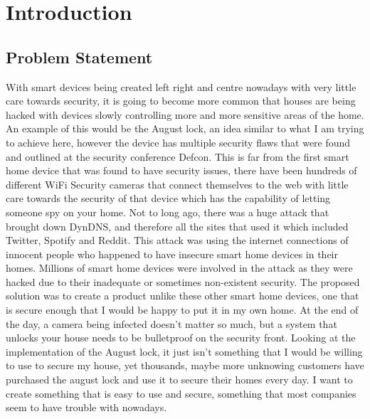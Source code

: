\chapter{Introduction}
\label{chap:intro}

\section{Problem Statement}
With smart devices being created left right and centre nowadays with very little care towards security, it is going to become more common that houses are being hacked with devices slowly controlling more and more sensitive areas of the home. An example of this would be the August lock, an idea similar to what I am trying to achieve here, however the device has multiple security flaws that were found and outlined at the security conference Defcon. This is far from the first smart home device that was found to have security issues, there have been hundreds of different WiFi Security cameras that connect themselves to the web with little care towards the security of that device which has the capability of letting someone spy on your home. Not to long ago, there was a huge attack that brought down DynDNS, and therefore all the sites that used it which included Twitter, Spotify and Reddit. This attack was using the internet connections of innocent people who happened to have insecure smart home devices in their homes. Millions of smart home devices were involved in the attack as they were hacked due to their inadequate or sometimes non-existent security.
\newline
\newline
The proposed solution was to create a product unlike these other smart home devices, one that is secure enough that I would be happy to put it in my own home. At the end of the day, a camera being infected doesn't matter so much, but a system that unlocks your house needs to be bulletproof on the security front. Looking at the implementation of the August lock, it just isn't something that I would be willing to use to secure my house, yet thousands, maybe more unknowing customers have purchased the august lock and use it to secure their homes every day. I want to create something that is easy to use and secure, something that most companies seem to have trouble with nowadays.


